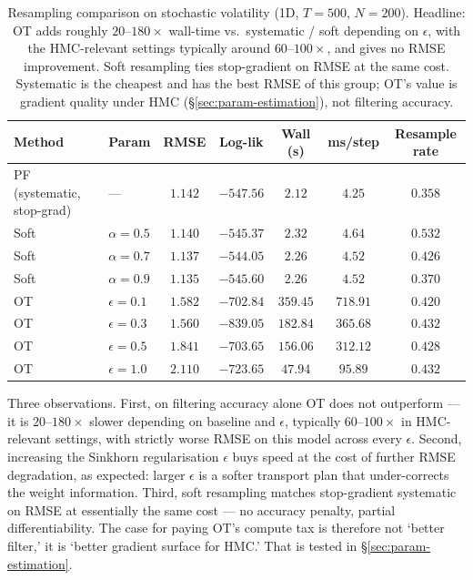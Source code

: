 \documentclass{article}
\begin{document}
\begin{table}[H]
\centering
\footnotesize
\caption{Resampling comparison on stochastic volatility (1D, $T=500$, $N=200$). Headline: OT adds roughly $20$--$180\times$ wall-time vs.\ systematic / soft depending on $\epsilon$, with the HMC-relevant settings typically around $60$--$100\times$, and gives no RMSE improvement. Soft resampling ties stop-gradient on RMSE at the same cost. Systematic is the cheapest and has the best RMSE of this group; OT's value is gradient quality under HMC (\S\ref{sec:param-estimation}), not filtering accuracy.}
\label{tab:soft-vs-ot-sv}
\begin{tabular}{llccccc}
\toprule
Method & Param & RMSE & Log-lik & Wall (s) & ms/step & Resample rate \\
\midrule
PF (systematic, stop-grad) & --- & $1.142$ & $-547.56$ & $2.12$  & $4.25$  & $0.358$ \\
\midrule
Soft & $\alpha = 0.5$ & $1.140$ & $-545.37$ & $2.32$  & $4.64$  & $0.532$ \\
Soft & $\alpha = 0.7$ & $1.137$ & $-544.05$ & $2.26$  & $4.52$  & $0.426$ \\
Soft & $\alpha = 0.9$ & $1.135$ & $-545.60$ & $2.26$  & $4.52$  & $0.370$ \\
\midrule
OT   & $\epsilon = 0.1$ & $1.582$ & $-702.84$ & $359.45$ & $718.91$ & $0.420$ \\
OT   & $\epsilon = 0.3$ & $1.560$ & $-839.05$ & $182.84$ & $365.68$ & $0.432$ \\
OT   & $\epsilon = 0.5$ & $1.841$ & $-703.65$ & $156.06$ & $312.12$ & $0.428$ \\
OT   & $\epsilon = 1.0$ & $2.110$ & $-723.65$ & $47.94$  & $95.89$  & $0.432$ \\
\bottomrule
\end{tabular}
\end{table}

Three observations. First, on filtering accuracy alone OT does not outperform --- it is $20$--$180\times$ slower depending on baseline and $\epsilon$, typically $60$--$100\times$ in HMC-relevant settings, with strictly worse RMSE on this model across every $\epsilon$. Second, increasing the Sinkhorn regularisation $\epsilon$ buys speed at the cost of further RMSE degradation, as expected: larger $\epsilon$ is a softer transport plan that under-corrects the weight information. Third, soft resampling matches stop-gradient systematic on RMSE at essentially the same cost --- no accuracy penalty, partial differentiability. The case for paying OT's compute tax is therefore not `better filter,' it is `better gradient surface for HMC.' That is tested in \S\ref{sec:param-estimation}.
\end{document}
